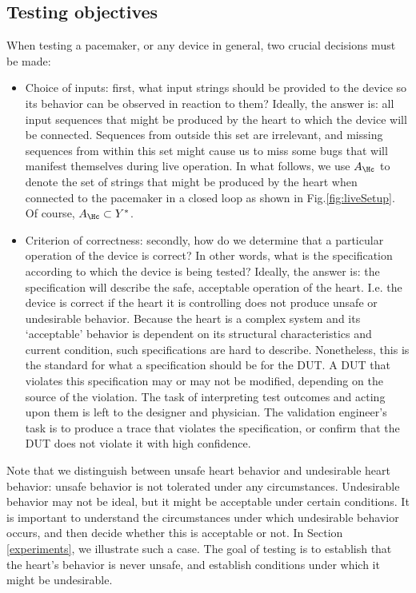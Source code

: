 \subsection{Testing objectives}
\label{testingObjectives}
When testing a pacemaker, or any device in general, two crucial decisions must be made:
\begin{itemize}
	\item Choice of inputs: first, what input strings should be provided to the device so its behavior can be observed in reaction to them? 
	Ideally, the answer is: all input sequences that might be produced by the heart to which the device will be connected. 
	Sequences from outside this set are irrelevant, and missing sequences from within this set might cause us to miss some bugs that will manifest themselves during live operation.
	In what follows, we use $A_\Hc$ to denote the set of strings that might be produced by the heart when connected to the pacemaker in a closed loop as shown in Fig.\ref{fig:liveSetup}. 
	Of course, $A_\Hc \subset Y^*$.
	\item Criterion of correctness: secondly, how do we determine that a particular operation of the device is correct? 
	In other words, what is the specification according to which the device is being tested?
	Ideally, the answer is: the specification will describe the safe, acceptable operation of the heart. 
	I.e. the device is correct if the heart it is controlling does not produce unsafe or undesirable behavior.
	Because the heart is a complex system and its `acceptable' behavior is dependent on its structural characteristics and current condition, such specifications are hard to describe. 
	Nonetheless, this is the standard for what a specification should be for the DUT. 
	A DUT that violates this specification may or may not be modified, depending on the source of the violation. 
	The task of interpreting test outcomes and acting upon them is left to the designer and physician.	
	The validation engineer's task is to produce a trace that violates the specification, or confirm that the DUT does not violate it with high confidence.
\end{itemize}
Note that we distinguish between unsafe heart behavior and undesirable heart behavior: unsafe behavior is not tolerated under any circumstances.
Undesirable behavior may not be ideal, but it might be acceptable under certain conditions. 
It is important to understand the circumstances under which undesirable behavior occurs, and then decide whether this is acceptable or not.
In Section \ref{experiments}, we illustrate such a case.
The goal of testing is to establish that the heart's behavior is never unsafe, and establish conditions under which it might be undesirable.

